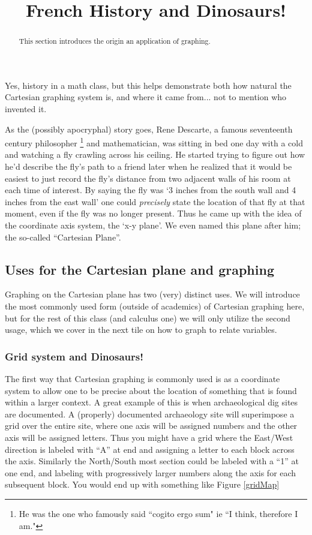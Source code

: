 \documentclass{ximera}
\title{French History and Dinosaurs!}
\begin{document}
\begin{abstract}
    This section introduces the origin an application of graphing.
\end{abstract}
\maketitle

Yes, history in a math class, but this helps demonstrate both how natural the Cartesian graphing system is, and where it came from... not to mention who invented it. 

As the (possibly apocryphal) story goes, Rene Descarte, a famous seventeenth century philosopher%
\footnote{
    He was the one who famously said ``cogito ergo sum" ie ``I think, therefore I am."
    }%
and mathematician, was sitting in bed one day with a cold and watching a fly crawling across his ceiling. He started trying to figure out how he'd describe the fly's path to a friend later when he realized that it would be easiest to just record the fly's distance from two adjacent walls of his room at each time of interest. By saying the fly was `3 inches from the south wall and 4 inches from the east wall' one could \textit{precisely} state the location of that fly at that moment, even if the fly was no longer present. Thus he came up with the idea of the coordinate axis system, the `x-y plane'. We even named this plane after him; the so-called ``Cartesian Plane''. 

\subsection*{Uses for the Cartesian plane and graphing}
    Graphing on the Cartesian plane has two (very) distinct uses. We will introduce the most commonly used form (outside of academics) of Cartesian graphing here, but for the rest of this class (and calculus one) we will only utilize the second usage, which we cover in the next tile on how to graph to relate variables.

    \subsubsection*{Grid system and Dinosaurs!}
        The first way that Cartesian graphing is commonly used is as a coordinate system to allow one to be precise about the location of something that is found within a larger context. A great example of this is when archaeological dig sites are documented. A (properly) documented archaeology site will superimpose a grid over the entire site, where one axis will be assigned numbers and the other axis will be assigned letters. Thus you might have a grid where the East/West direction is labeled with ``A'' at end and assigning a letter to each block across the axis. Similarly the North/South most section could be labeled with a ``1'' at one end, and labeling with progressively larger numbers along the axis for each subsequent block. You would end up with something like Figure \ref{gridMap}
        
\end{document}
